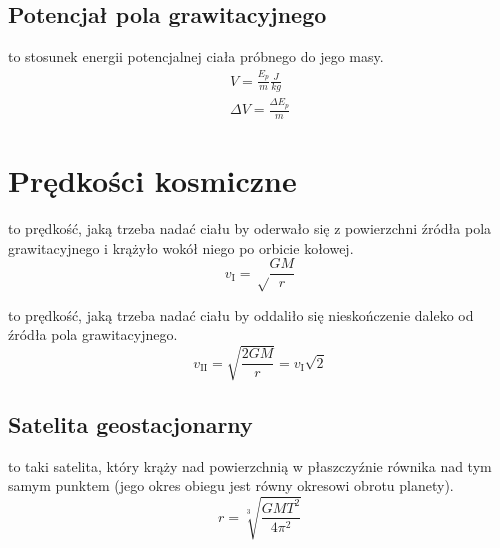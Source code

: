 \subsection{Potencjał pola grawitacyjnego}
\begin{definition}
   to stosunek energii potencjalnej ciała próbnego do jego masy.
  \begin{subequations}
    \begin{gather}
      V = \frac{E_p}{m} \unit{\frac{J}{kg}}\\
      \Delta V = \frac{\Delta E_p}{m}
    \end{gather}
  \end{subequations}
\end{definition}

\section{Prędkości kosmiczne}

\begin{definition}
   to prędkość, jaką trzeba nadać ciału by oderwało się z
  powierzchni źródła pola grawitacyjnego i krążyło wokół niego po orbicie kołowej.
  \begin{equation*}
    v_{\scriptscriptstyle\mathrm I} = \sqrt\frac{GM}{r}
  \end{equation*}
\end{definition}

\begin{definition}
   to prędkość, jaką trzeba nadać ciału by oddaliło się nieskończenie
  daleko od źródła pola grawitacyjnego.
  \begin{equation*}
    v_{\scriptscriptstyle \mathrm{II}} = \sqrt{\frac{2GM}{r}} = v_{\scriptscriptstyle\mathrm I} \sqrt 2
  \end{equation*}
\end{definition}

\subsection{Satelita geostacjonarny}
\begin{definition}
   to taki satelita, który krąży nad powierzchnią w płaszczyźnie
  równika nad tym samym punktem (jego okres obiegu jest równy okresowi obrotu planety).
  \begin{equation*}
    r = \sqrt[3]{\frac{GMT^2}{4\pi^2}}
  \end{equation*}
\end{definition}
